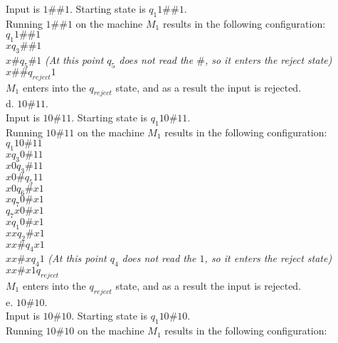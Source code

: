 \documentclass[12pt]{article}
\begin{document}
Input is $1\#\#1$. Starting state is $q_1 1\#\#1$. \\
Running $1\#\#1$ on the machine $M_1$ results in the following configuration: \\

$q_1 1 \# \# 1$ \\
$x q_3 \# \# 1$ \\
$x \# q_5 \# 1$ \textit{(At this point $q_5$ does not read the $\#$, so it enters the reject state)} \\
$x \# \# q_{reject} 1 $ \\
$M_1$ enters into the $q_{reject}$ state, and as a result the input is rejected. \\

\pagebreak
d. $10\#11$. \\

Input is $10\#11$. Starting state is $q_1 10\#11$. \\
Running $10\#11$ on the machine $M_1$ results in the following configuration: \\

$        q_1 10 \# 11  $ \\
$x       q_3 0 \# 11   $ \\
$x0      q_3 \# 11     $ \\
$x0 \#   q_5 11        $ \\
$x0      q_6 \# x 1    $ \\
$x       q_7 0 \# x 1    $ \\
$        q_7 x 0 \# x 1  $ \\
$x       q_1 0 \# x 1    $ \\
$xx      q_2 \# x 1      $ \\
$xx \#   q_4 x 1         $ \\
$xx \# x q_4 1 $ \textit{(At this point $q_4$ does not read the $1$, so it enters the reject state)} \\
$xx \# x 1 q_{reject}    $ \\
$M_1$ enters into the $q_{reject}$ state, and as a result the input is rejected. \\

\pagebreak
e. $10\#10$. \\

Input is $10\#10$. Starting state is $q_1 10\#10$. \\
Running $10\#10$ on the machine $M_1$ results in the following configuration: \\
\end{document}
